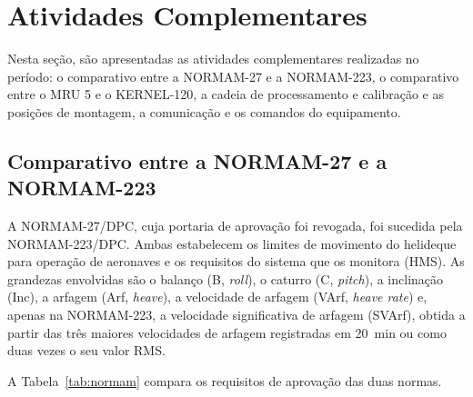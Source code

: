 \documentclass[a4paper, 12pt]{article}
\begin{document}
\newpage
\section{Atividades Complementares}\label{sec:complementares}

Nesta seção, são apresentadas as atividades complementares realizadas no período: o comparativo entre a NORMAM-27 e a NORMAM-223, o comparativo entre o MRU 5 e o KERNEL-120, a cadeia de processamento e calibração e as posições de montagem, a comunicação e os comandos do equipamento.

\subsection{Comparativo entre a NORMAM-27 e a NORMAM-223}
\label{sec:normam}

A NORMAM-27/DPC, cuja portaria de aprovação foi revogada, foi sucedida pela NORMAM-223/DPC.
Ambas estabelecem os limites de movimento do helideque para operação de aeronaves e os
requisitos do sistema que os monitora (HMS). As grandezas envolvidas são o balanço (B,
\textit{roll}), o caturro (C, \textit{pitch}), a inclinação (Inc), a arfagem (Arf,
\textit{heave}), a velocidade de arfagem (VArf, \textit{heave rate}) e, apenas na
NORMAM-223, a velocidade significativa de arfagem (SVArf), obtida a partir das três maiores
velocidades de arfagem registradas em 20~min ou como duas vezes o seu valor RMS.

A Tabela~\ref{tab:normam} compara os requisitos de aprovação das duas normas.
\end{document}

